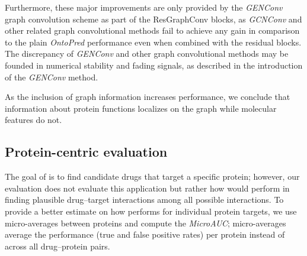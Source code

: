 \documentclass{bioinfo}
\begin{document}
Furthermore, these major improvements are only provided by the \textit{GENConv} graph convolution scheme as part of the ResGraphConv blocks, as \textit{GCNConv} and other related graph convolutional methods fail to achieve any gain in comparison to the plain \textit{OntoPred} performance even when combined with the residual blocks. The discrepancy of {\em GENConv} and other graph convolutional methods may be founded in numerical stability and fading signals, as described in the introduction of the {\em GENConv} method.  

As the inclusion of graph information increases performance, we conclude that information about protein
functions localizes on the graph while molecular features do not.










\subsection{Protein-centric evaluation}
The goal of \name is to find candidate drugs that target a specific
protein; however, our evaluation does not evaluate this application
but rather how \name would perform in finding plausible drug--target
interactions among all possible interactions. To provide a better
estimate on how \name performs for individual protein targets, we use
micro-averages between proteins and compute the \textit{MicroAUC};
micro-averages average the performance (true and false positive rates)
per protein instead of across all drug--protein pairs.

\end{document}
